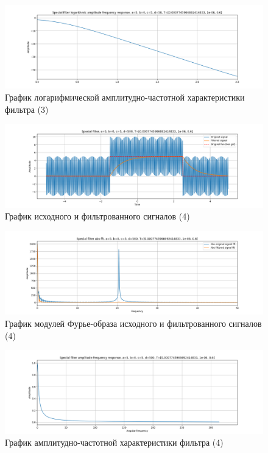 \documentclass[a4paper, 12pt]{article}
\begin{document}
    \begin{figure}[H]
        \centering
        \includegraphics[scale=0.4]{3_fl2_lafr.png}
        \captionsetup{skip=0pt}
        \caption{График логарифмической амплитудно-частотной характеристики фильтра (3)}
        \label{fig:filinlafr23}
    \end{figure}
    \begin{figure}[H]
        \centering
        \includegraphics[scale=0.4]{4_fl2.png}
        \captionsetup{skip=0pt}
        \caption{График исходного и фильтрованного сигналов (4)}
        \label{fig:filin24}
    \end{figure}
    \begin{figure}[H]
        \centering
        \includegraphics[scale=0.4]{4_fl2_abs.png}
        \captionsetup{skip=0pt}
        \caption{График модулей Фурье-образа исходного и фильтрованного сигналов (4)}
        \label{fig:filinabs24}
    \end{figure}
    \begin{figure}[H]
        \centering
        \includegraphics[scale=0.4]{4_fl2_afr.png}
        \captionsetup{skip=0pt}
        \caption{График амплитудно-частотной характеристики фильтра (4)}
        \label{fig:filinafr24}
    \end{figure}
\end{document}
